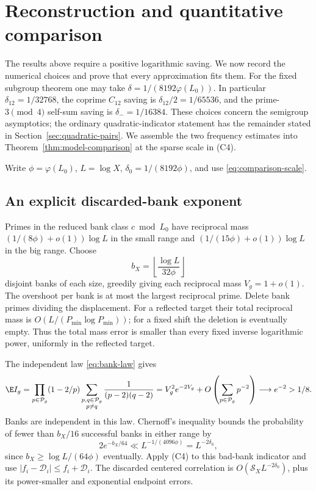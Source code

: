 \section{Reconstruction and quantitative comparison}\label{sec:assembly}

The results above require a positive logarithmic saving. We now record
the numerical choices and prove that every approximation fits them.
For the fixed subgroup theorem one may take
\(\delta=1/(8192\varphi(L_0))\). In particular
\(\delta_{12}=1/32768\), the coprime \(C_{12}\) saving is
\(\delta_{12}/2=1/65536\), and the prime-\(3\pmod4\) self-sum
saving is \(\delta_-=1/16384\). These choices concern the
semigroup asymptotics; the ordinary quadratic-indicator statement
has the remainder stated in Section~\ref{sec:quadratic-pairs}.
We assemble the two frequency estimates into
Theorem~\ref{thm:model-comparison} at the sparse scale in (C4).

Write \(\phi=\varphi(L_0)\), \(L=\log X\),
\(\delta_0=1/(8192\phi)\), and use \eqref{eq:comparison-scale}.

\subsection{An explicit discarded-bank exponent}
Primes in the reduced bank class \(c\bmod L_0\) have reciprocal
mass \((1/(8\phi)+o(1))\log L\) in the small range and
\((1/(15\phi)+o(1))\log L\) in the big range. Choose
\[
 b_X=\left\lfloor\frac{\log L}{32\phi}\right\rfloor
\]
disjoint banks of each size, greedily giving each reciprocal mass
\(V_g=1+o(1)\). The overshoot per bank is at most the largest
reciprocal prime. Delete bank primes dividing the displacement.
For a reflected target their total reciprocal mass is
\(O(L/(P_{\min}\log P_{\min}))\); for a fixed shift the deletion
is eventually empty. Thus the total mass error is smaller than every
fixed inverse logarithmic power, uniformly in the reflected target.

The independent law \eqref{eq:bank-law} gives
\begin{equation}\label{eq:success}
 \E I_g=\prod_{p\in\mathcal P_g}(1-2/p)
 \sum_{\substack{p,q\in\mathcal P_g\\p\ne q}}
                  \frac1{(p-2)(q-2)}
 =V_g^2e^{-2V_g}+O\left(\sum_{p\in\mathcal P_g}p^{-2}\right)
 \longrightarrow e^{-2}>1/8.
\end{equation}
Banks are independent in this law. Chernoff's inequality bounds the
probability of fewer than \(b_X/16\) successful banks in either range by
\begin{equation}\label{eq:rare-budget}
 2e^{-b_X/64}\ll L^{-1/(4096\phi)}=L^{-2\delta_0},
\end{equation}
since \(b_X\ge\log L/(64\phi)\) eventually. Apply (C4) to this
bad-bank indicator and use \(|f_i-\mathcal D_i|\le f_i+\mathcal D_i\).
The discarded centered correlation is
\(O(\mathcal S_XL^{-2\delta_0})\), plus its power-smaller
and exponential endpoint errors.


